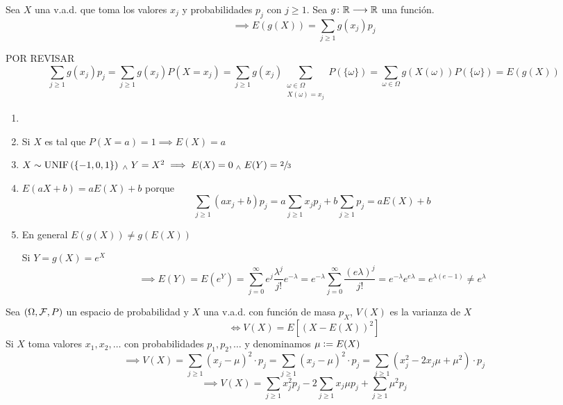 \begin{teo}
    Sea $X$ una v.a.d. que toma los valores $x_j$ y probabilidades $p_j$ con $j \geq 1$. Sea $g \colon \mathbb{R} \longrightarrow \mathbb{R}$ una función.
    \[\implies E(g(X))=\sum_{j\geq 1}g(x_j)p_j\]
    \begin{dem}
        POR REVISAR
        \[\sum_{j\geq 1}g(x_j)p_j=\sum_{j\geq 1}g(x_j)P(X=x_j)=\sum_{j\geq 1}g(x_j)\sum_{\substack{\omega\in\Omega \\ X(\omega)=x_j}}P(\{\omega\})=\sum_{\omega\in\Omega}g(X(\omega))P(\{\omega\})=E(g(X))\]
    \end{dem}
\end{teo}

\begin{obs}
    \begin{enumerate}
        \item[]
        \item Si $X$ es tal que $P(X=a)=1\implies E(X)=a$
        \item $X \sim \operatorname{UNIF}\left(\{-1, 0, 1\}\right) \; _{\wedge} \; Y=X^2 \implies E(X)=0 \; _{\wedge} \; E(Y)=\sfrac{2}{3}$
        \item $E(aX+b)=aE(X)+b$ porque
        \[\sum_{j\geq 1}(ax_j+b)p_j=a\sum_{j\geq 1}x_jp_j+b\sum_{j\geq 1}p_j=aE(X)+b\]
        \item En general $E(g(X)) \ne g(E(X))$
        \begin{ejem}[$X\sim\poisson{\lambda} \implies E(X)=\lambda$]
            Si $Y=g(X)=e^X$
  		      \[\implies E(Y)=E(e^Y)=\sum_{j=0}^\infty e^j\frac{\lambda^j}{j!}e^{-\lambda}=e^{-\lambda}\sum_{j=0}^\infty \frac{(e\lambda)^{j}}{j!}=e^{-\lambda}e^{e\lambda}=e^{\lambda(e-1)}\ne e^\lambda\]
        \end{ejem}
    \end{enumerate}
\end{obs}

\begin{defn}
	Sea $(\Omega, \mathcal{F}, P)$ un espacio de probabilidad y $X$ una v.a.d. con función de masa $p_X$, $V(X)$ es la varianza de $X$
	\[\iff V(X)=E\left[(X-E(X))^2\right]\] 
	Si $X$ toma valores $x_1, x_2, \dots$ con probabilidades $p_1, p_2, \dots$ y denominamos $\mu \vcentcolon= E(X)$
	\[\implies V(X)=\sum_{j\geq 1}(x_j-\mu)^2\cdot p_j = \sum_{j\geq 1}(x_j-\mu)^2\cdot p_j = \sum_{j\geq 1}(x_j^2-2x_j\mu+\mu^2)\cdot p_j\]
    \[\implies V(X)=\sum_{j\geq 1}x_j^2p_j -2\sum_{j\geq 1}x_j\mu p_j +\sum_{j\geq 1}\mu^2p_j\]
\end{defn}


